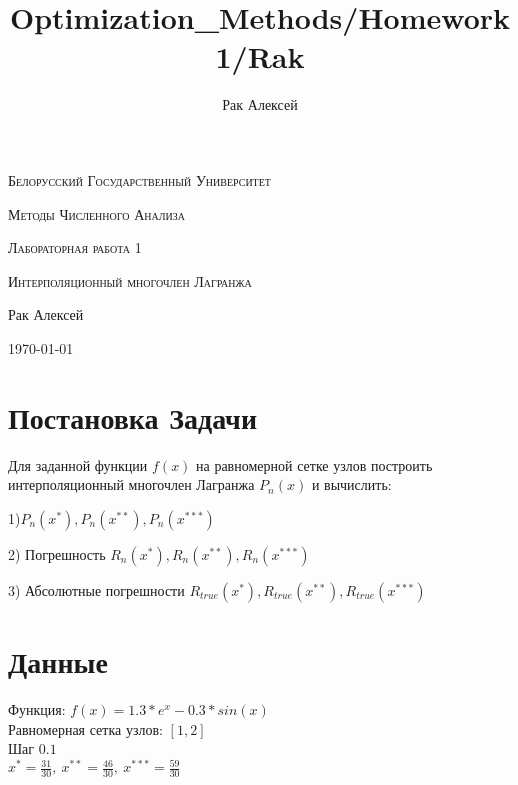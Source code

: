 \documentclass[10pt]{scrartcl}
\begin{document}
\author{Рак Алексей}
\title{Optimization_Methods/Homework1/Rak}
\begin{titlepage}
		\centering
		{\scshape\LARGE Белорусский Государственный Университет \par}
        \vfill
        {\scshape\LARGE Методы Численного Анализа\par}
        \vspace{1cm}
        {\scshape\LARGE Лабораторная работа 1\par}
        \vspace{1cm}
        {\scshape\LARGE Интерполяционный многочлен Лагранжа\par}
        \vspace{2cm}
        {\LARGE Рак Алексей\par}
        \vfill
        {\large \today}
\end{titlepage}
\section*{Постановка Задачи}\noindent
Для заданной функции $f(x)$ на равномерной сетке узлов построить интерполяционный многочлен Лагранжа $P_n(x)$ и вычислить:

1)$P_n(x^*), P_n(x^{**}), P_n(x^{***})$

2) Погрешность $R_n(x^{*}), R_n(x^{**}), R_n(x^{***})$

3) Абсолютные погрешности $R_{true}(x^*), R_{true}(x^{**}), R_{true}(x^{***})$

\section*{Данные}\noindent
Функция: $f(x) = 1.3 * e^x - 0.3 * sin(x)$\\
Равномерная сетка узлов: $[1, 2]$\\
Шаг $0.1$\\
$x^{*} = \frac{31}{30}, \ x^{**} = \frac{46}{30}, \ x^{***} = \frac{59}{30}$
\end{document}
